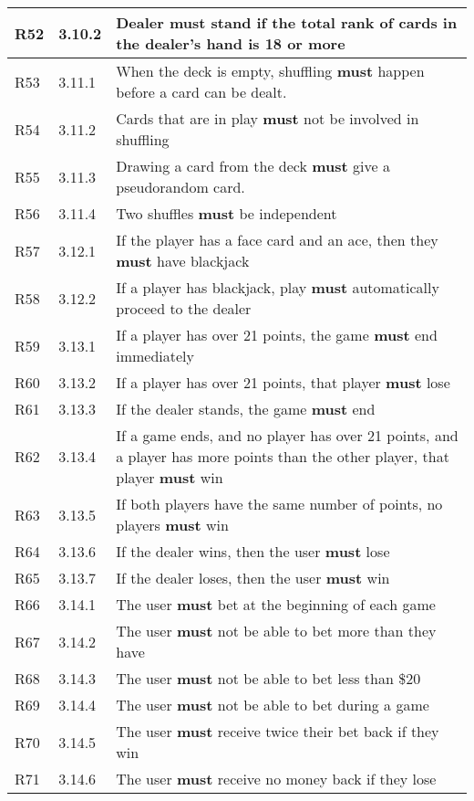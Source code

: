 \documentclass{article}
\begin{document}
\begin{tabular}{|l|l|p{5in}|}
R52 & 3.10.2 & Dealer \textbf{must} stand if the total rank of cards in the dealer's hand is 18 or more \\\hline
R53 & 3.11.1 & When the deck is empty, shuffling \textbf{must} happen before a card can be dealt. \\\hline
R54 & 3.11.2 & Cards that are in play \textbf{must} not be involved in shuffling \\\hline
R55 & 3.11.3 & Drawing a card from the deck \textbf{must} give a pseudorandom card. \\\hline
R56 & 3.11.4 & Two shuffles \textbf{must} be independent \\\hline
R57 & 3.12.1 &  If the player has a face card and an ace, then they \textbf{must} have blackjack \\\hline
R58 & 3.12.2 & If a player has blackjack, play \textbf{must} automatically proceed to the dealer \\\hline
R59 & 3.13.1 & If a player has over 21 points, the game \textbf{must} end immediately \\\hline
R60 & 3.13.2 & If a player has over 21 points, that player \textbf{must} lose \\\hline
R61 & 3.13.3 & If the dealer stands, the game \textbf{must} end \\\hline
R62 & 3.13.4 &  If a game ends, and no player has over 21 points, and a player has more points than the other player, that player \textbf{must} win \\\hline
R63 & 3.13.5 &  If both players have the same number of points, no players \textbf{must} win \\\hline
R64 & 3.13.6 & If the dealer wins, then the user \textbf{must} lose \\\hline
R65 & 3.13.7 & If the dealer loses, then the user \textbf{must} win \\\hline
R66 & 3.14.1 & The user \textbf{must} bet at the beginning of each game \\\hline
R67 & 3.14.2 & The user \textbf{must} not be able to bet more than they have \\\hline
R68 & 3.14.3 & The user \textbf{must} not be able to bet less than \$20 \\\hline
R69 & 3.14.4 & The user \textbf{must} not be able to bet during a game \\\hline
R70 & 3.14.5 & The user \textbf{must} receive twice their bet back if they win \\\hline
R71 & 3.14.6 & The user \textbf{must} receive no money back if they lose \\\hline

\end{tabular}
\end{document}
